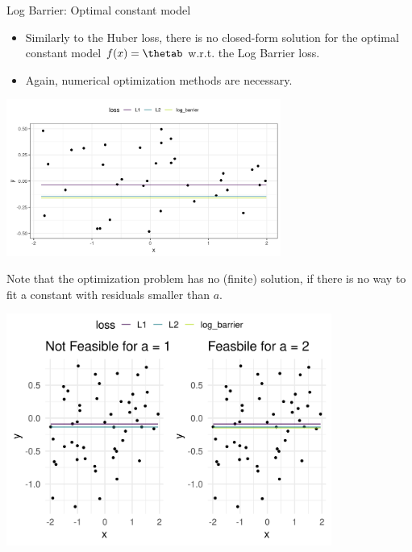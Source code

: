 \begin{vbframe}{Log Barrier: Optimal constant model}

\begin{itemize}
 \item Similarly to the Huber loss, there is no closed-form solution for the optimal constant model $\fx = \thetab$ w.r.t. the Log Barrier loss. 
 \item Again, numerical optimization methods are necessary. 
\end{itemize}

\vspace{0.2cm}

\begin{center}
\includegraphics[width = 9cm ]{figure_man/log_barrier2.png} \\
\end{center}


\framebreak 


Note that the optimization problem has no (finite) solution, if there is no way to fit a constant with residuals smaller than $a$. 

\vspace{- 0.2cm}


\begin{center}
\includegraphics[width = 0.8\textwidth]{figure_man/log_barrier_2_1.png} \\
\end{center}


\end{vbframe}





